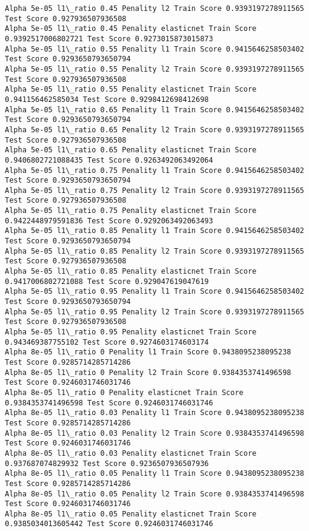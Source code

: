 \documentclass[11pt]{article}
\begin{document}
\begin{Verbatim}[commandchars=\\\{\}]
Alpha 5e-05 l1\_ratio 0.45 Penality l2 Train Score 0.9393197278911565 Test Score 0.927936507936508
Alpha 5e-05 l1\_ratio 0.45 Penality elasticnet Train Score 0.9392517006802721 Test Score 0.9273015873015873
Alpha 5e-05 l1\_ratio 0.55 Penality l1 Train Score 0.9415646258503402 Test Score 0.9293650793650794
Alpha 5e-05 l1\_ratio 0.55 Penality l2 Train Score 0.9393197278911565 Test Score 0.927936507936508
Alpha 5e-05 l1\_ratio 0.55 Penality elasticnet Train Score 0.941156462585034 Test Score 0.9298412698412698
Alpha 5e-05 l1\_ratio 0.65 Penality l1 Train Score 0.9415646258503402 Test Score 0.9293650793650794
Alpha 5e-05 l1\_ratio 0.65 Penality l2 Train Score 0.9393197278911565 Test Score 0.927936507936508
Alpha 5e-05 l1\_ratio 0.65 Penality elasticnet Train Score 0.9406802721088435 Test Score 0.9263492063492064
Alpha 5e-05 l1\_ratio 0.75 Penality l1 Train Score 0.9415646258503402 Test Score 0.9293650793650794
Alpha 5e-05 l1\_ratio 0.75 Penality l2 Train Score 0.9393197278911565 Test Score 0.927936507936508
Alpha 5e-05 l1\_ratio 0.75 Penality elasticnet Train Score 0.9422448979591836 Test Score 0.9292063492063493
Alpha 5e-05 l1\_ratio 0.85 Penality l1 Train Score 0.9415646258503402 Test Score 0.9293650793650794
Alpha 5e-05 l1\_ratio 0.85 Penality l2 Train Score 0.9393197278911565 Test Score 0.927936507936508
Alpha 5e-05 l1\_ratio 0.85 Penality elasticnet Train Score 0.9417006802721088 Test Score 0.929047619047619
Alpha 5e-05 l1\_ratio 0.95 Penality l1 Train Score 0.9415646258503402 Test Score 0.9293650793650794
Alpha 5e-05 l1\_ratio 0.95 Penality l2 Train Score 0.9393197278911565 Test Score 0.927936507936508
Alpha 5e-05 l1\_ratio 0.95 Penality elasticnet Train Score 0.943469387755102 Test Score 0.9274603174603174
Alpha 8e-05 l1\_ratio 0 Penality l1 Train Score 0.9438095238095238 Test Score 0.9285714285714286
Alpha 8e-05 l1\_ratio 0 Penality l2 Train Score 0.9384353741496598 Test Score 0.9246031746031746
Alpha 8e-05 l1\_ratio 0 Penality elasticnet Train Score 0.9384353741496598 Test Score 0.9246031746031746
Alpha 8e-05 l1\_ratio 0.03 Penality l1 Train Score 0.9438095238095238 Test Score 0.9285714285714286
Alpha 8e-05 l1\_ratio 0.03 Penality l2 Train Score 0.9384353741496598 Test Score 0.9246031746031746
Alpha 8e-05 l1\_ratio 0.03 Penality elasticnet Train Score 0.937687074829932 Test Score 0.9236507936507936
Alpha 8e-05 l1\_ratio 0.05 Penality l1 Train Score 0.9438095238095238 Test Score 0.9285714285714286
Alpha 8e-05 l1\_ratio 0.05 Penality l2 Train Score 0.9384353741496598 Test Score 0.9246031746031746
Alpha 8e-05 l1\_ratio 0.05 Penality elasticnet Train Score 0.9385034013605442 Test Score 0.9246031746031746

\end{Verbatim}
\end{document}

